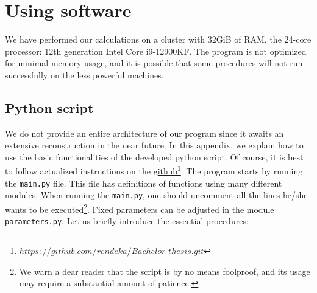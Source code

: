 \chapter{Using software}

We have performed our calculations on a cluster with 32GiB of RAM, the 24-core processor: 12th generation Intel Core i9-12900KF. The program is not optimized for minimal memory usage, and it is possible that some procedures will not run successfully on the less powerful machines.

\section{Python script}
\label{sec:code}
We do not provide an entire architecture of our program since it awaits an extensive reconstruction in the near future. In this appendix, we explain how to use the basic functionalities of the developed python script. Of course, it is best to follow actualized instructions on the \href{https://github.com/rendeka/Bachelor_thesis.git}{github\footnote{\href{https://github.com/rendeka/Bachelor_thesis.git}{$https://github.com/rendeka/Bachelor\_thesis.git$}}}. The program starts by running the \verb|main.py| file. This file has definitions of functions using many different modules. When running the \verb|main.py|, one should uncomment all the lines he/she wants to be executed\footnote{We warn a dear reader that the script is by no means foolproof, and its usage may require a substantial amount of patience.}. Fixed parameters can be adjusted in the module \verb|parameters.py|. Let us briefly introduce the essential procedures:

